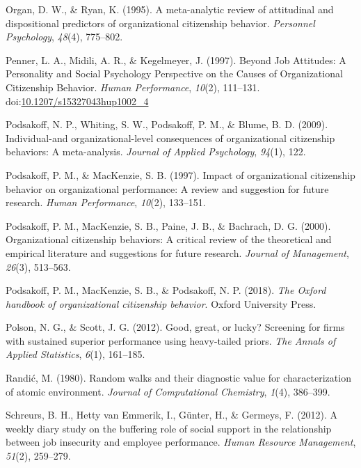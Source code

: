 \documentclass[english,,man]{apa6}
\theoremstyle{definition}
\theoremstyle{definition}
\theoremstyle{definition}
\theoremstyle{remark}
\begin{document}
\leavevmode\hypertarget{ref-organ_meta-analytic_1995}{}%
Organ, D. W., \& Ryan, K. (1995). A meta-analytic review of attitudinal
and dispositional predictors of organizational citizenship behavior.
\emph{Personnel Psychology}, \emph{48}(4), 775--802.

\leavevmode\hypertarget{ref-penner_beyond_1997}{}%
Penner, L. A., Midili, A. R., \& Kegelmeyer, J. (1997). Beyond Job
Attitudes: A Personality and Social Psychology Perspective on the Causes
of Organizational Citizenship Behavior. \emph{Human Performance},
\emph{10}(2), 111--131.
doi:\href{https://doi.org/10.1207/s15327043hup1002_4}{10.1207/s15327043hup1002\_4}

\leavevmode\hypertarget{ref-podsakoff_individual-and_2009}{}%
Podsakoff, N. P., Whiting, S. W., Podsakoff, P. M., \& Blume, B. D.
(2009). Individual-and organizational-level consequences of
organizational citizenship behaviors: A meta-analysis. \emph{Journal of
Applied Psychology}, \emph{94}(1), 122.

\leavevmode\hypertarget{ref-podsakoff_impact_1997}{}%
Podsakoff, P. M., \& MacKenzie, S. B. (1997). Impact of organizational
citizenship behavior on organizational performance: A review and
suggestion for future research. \emph{Human Performance}, \emph{10}(2),
133--151.

\leavevmode\hypertarget{ref-podsakoff_organizational_2000}{}%
Podsakoff, P. M., MacKenzie, S. B., Paine, J. B., \& Bachrach, D. G.
(2000). Organizational citizenship behaviors: A critical review of the
theoretical and empirical literature and suggestions for future
research. \emph{Journal of Management}, \emph{26}(3), 513--563.

\leavevmode\hypertarget{ref-podsakoff_oxford_2018}{}%
Podsakoff, P. M., MacKenzie, S. B., \& Podsakoff, N. P. (2018).
\emph{The Oxford handbook of organizational citizenship behavior}.
Oxford University Press.

\leavevmode\hypertarget{ref-polson2012good}{}%
Polson, N. G., \& Scott, J. G. (2012). Good, great, or lucky? Screening
for firms with sustained superior performance using heavy-tailed priors.
\emph{The Annals of Applied Statistics}, \emph{6}(1), 161--185.

\leavevmode\hypertarget{ref-randic1980random}{}%
Randić, M. (1980). Random walks and their diagnostic value for
characterization of atomic environment. \emph{Journal of Computational
Chemistry}, \emph{1}(4), 386--399.

\leavevmode\hypertarget{ref-schreurs2012weekly}{}%
Schreurs, B. H., Hetty van Emmerik, I., Günter, H., \& Germeys, F.
(2012). A weekly diary study on the buffering role of social support in
the relationship between job insecurity and employee performance.
\emph{Human Resource Management}, \emph{51}(2), 259--279.
\end{document}
